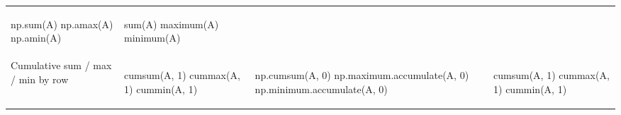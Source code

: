 \documentclass[10pt, landscape]{article}
\newenvironment{Shaded}{}{}
\newcommand{\DecValTok}[1]{\textcolor[rgb]{0.25,0.63,0.44}{{#1}}}
\newcommand{\FloatTok}[1]{\textcolor[rgb]{0.25,0.63,0.44}{{#1}}}
\newcommand{\BuiltInTok}[1]{{#1}}
\newcommand{\NormalTok}[1]{{#1}}
\begin{document}
\begin{multicols*}{2}
\begin{table}[ht]
\begin{tabular}[ ]{@{}llll@{}}
\begin{minipage}[t]{0.24\columnwidth}
\begin{Shaded}
\begin{Highlighting}[]
\NormalTok{np.}\BuiltInTok{sum}\NormalTok{(A)}
\NormalTok{np.amax(A)}
\NormalTok{np.amin(A)}
\end{Highlighting}
\end{Shaded}
\strut
\end{minipage} & \begin{minipage}[t]{0.20\columnwidth}\raggedright\strut
\begin{Shaded}
\begin{Highlighting}[]
\NormalTok{sum(A)}
\NormalTok{maximum(A)}
\NormalTok{minimum(A)}
\end{Highlighting}
\end{Shaded}
\strut
\end{minipage}\tabularnewline
\begin{minipage}[t]{0.23\columnwidth}\raggedright\strut
Cumulative sum / max / min by row\strut
\end{minipage} & \begin{minipage}[t]{0.22\columnwidth}\raggedright\strut
\begin{Shaded}
\begin{Highlighting}[]
\NormalTok{cumsum(A, }\FloatTok{1}\NormalTok{)}
\NormalTok{cummax(A, }\FloatTok{1}\NormalTok{)}
\NormalTok{cummin(A, }\FloatTok{1}\NormalTok{)}
\end{Highlighting}
\end{Shaded}
\strut
\end{minipage} & \begin{minipage}[t]{0.24\columnwidth}\raggedright\strut
\begin{Shaded}
\begin{Highlighting}[]
\NormalTok{np.cumsum(A, }\DecValTok{0}\NormalTok{)}
\NormalTok{np.maximum.accumulate(A, }\DecValTok{0}\NormalTok{)}
\NormalTok{np.minimum.accumulate(A, }\DecValTok{0}\NormalTok{)}
\end{Highlighting}
\end{Shaded}
\strut
\end{minipage} & \begin{minipage}[t]{0.20\columnwidth}\raggedright\strut
\begin{Shaded}
\begin{Highlighting}[]
\NormalTok{cumsum(A, }\FloatTok{1}\NormalTok{)}
\NormalTok{cummax(A, }\FloatTok{1}\NormalTok{)}
\NormalTok{cummin(A, }\FloatTok{1}\NormalTok{)}
\end{Highlighting}
\end{Shaded}
\strut
\end{minipage}\tabularnewline

\end{tabular}
\end{table}
\end{multicols*}
\end{document}
